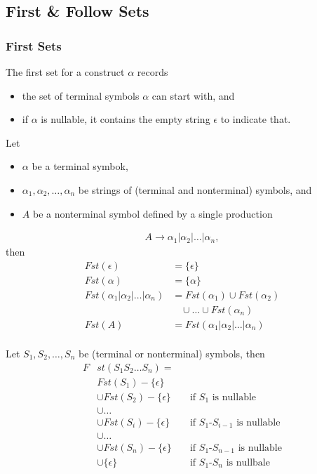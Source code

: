 \subsection{First \& Follow Sets}

\subsubsection{First Sets}
The first set for a construct $\alpha$ records
\begin{itemize}
    \item the set of terminal symbols $\alpha$ can start with, and
    \item if $\alpha$ is nullable, it contains the empty string $\epsilon$ to indicate that.
\end{itemize}

Let
\begin{itemize}
    \item $\alpha$ be a terminal symbok,
    \item $\alpha_1,\alpha_2,\dots,\alpha_n$ be strings of (terminal and nonterminal) symbols, and
    \item $A$ be a nonterminal symbol defined by a single production
\end{itemize}
\begin{align*}
    A \rightarrow \alpha_1 | \alpha_2 | \dots | \alpha_n,
\end{align*}
then
\begin{align*}
    Fst(\epsilon) &= \{\epsilon\}\\
    Fst(\alpha) &= \{\alpha\}\\
    Fst(\alpha_1 | \alpha_2 | \dots | \alpha_n) &= Fst(\alpha_1) \cup Fst(\alpha_2)\\
                                                  &\ \ \ \ \cup \dots \cup Fst(\alpha_n)\\  
    Fst(A) &= Fst(\alpha_1 | \alpha_2 | \dots | \alpha_n)\\
\end{align*}

Let $S_1,S_2,\dots,S_n$ be (terminal or nonterminal) symbols, then
\begin{align*}
    F&st(S_1 S_2 \dots S_n) =\\
    &Fst(S_1) - \{\epsilon\}\\
    &\cup Fst(S_2) - \{\epsilon\} &&\text{if $S_1$ is nullable}\\
    &\cup \dots\\
    &\cup Fst(S_i) - \{\epsilon\} &&\text{if $S_1$-$S_{i-1}$ is nullable}\\
    &\cup \dots\\
    &\cup Fst(S_n) - \{\epsilon\} &&\text{if $S_1$-$S_{n-1}$ is nullable}\\
    &\cup \{\epsilon\} &&\text{if $S_1$-$S_n$ is nullbale}
\end{align*}

